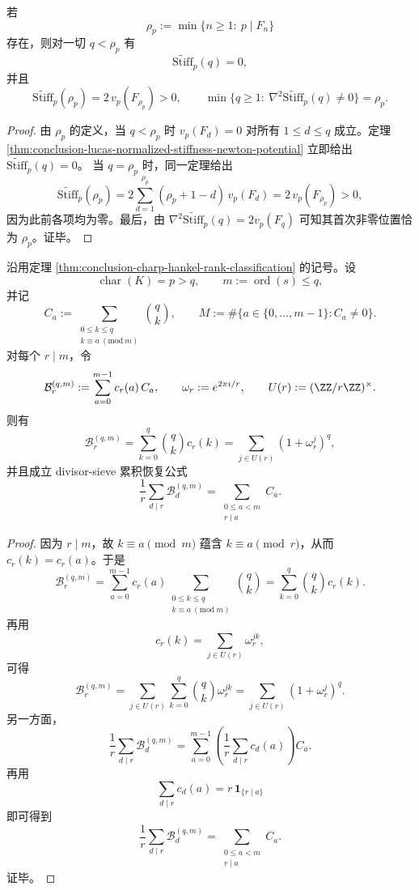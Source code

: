 \begin{corollary}\label{cor:conclusion-lucas-stiffness-rank-of-apparition}
若
\[
\rho_p:=\min\{n\ge 1:\ p\mid F_n\}
\]
存在，则对一切 \(q<\rho_p\) 有
\[
\widetilde{\mathrm{Stiff}}_p(q)=0,
\]
并且
\[
\widetilde{\mathrm{Stiff}}_p(\rho_p)=2\,v_p(F_{\rho_p})>0,
\qquad
\min\{q\ge 1:\ \nabla^2\widetilde{\mathrm{Stiff}}_p(q)\neq 0\}=\rho_p.
\]
\end{corollary}
\begin{proof}
由 \(\rho_p\) 的定义，当 \(q<\rho_p\) 时 \(v_p(F_d)=0\) 对所有 \(1\le d\le q\) 成立。定理 \ref{thm:conclusion-lucas-normalized-stiffness-newton-potential} 立即给出
\(
\widetilde{\mathrm{Stiff}}_p(q)=0
\)。
当 \(q=\rho_p\) 时，同一定理给出
\[
\widetilde{\mathrm{Stiff}}_p(\rho_p)
=
2\sum_{d=1}^{\rho_p}(\rho_p+1-d)\,v_p(F_d)
=
2\,v_p(F_{\rho_p})>0,
\]
因为此前各项均为零。最后，由
\(
\nabla^2\widetilde{\mathrm{Stiff}}_p(q)=2v_p(F_q)
\)
可知其首次非零位置恰为 \(\rho_p\)。证毕。
\end{proof}

\begin{proposition}\label{prop:conclusion-charp-residue-lumping-ramanujan-shadows}
沿用定理 \ref{thm:conclusion-charp-hankel-rank-classification} 的记号。设
\[
\operatorname{char}(K)=p>q,\qquad
m:=\operatorname{ord}(s)\le q,
\]
并记
\[
C_a:=\sum_{\substack{0\le k\le q\\ k\equiv a\ (\mathrm{mod}\ m)}}\binom{q}{k},
\qquad
M:=\#\{a\in\{0,\dots,m-1\}:C_a\neq 0\}.
\]
对每个 \(r\mid m\)，令
\[
\mathcal B_r^{(q,m)}:=\sum_{a=0}^{m-1}c_r(a)\,C_a,
\qquad
\omega_r:=e^{2\pi i/r},
\qquad
U(r):=(\ZZ/r\ZZ)^\times.
\]
则有
\[
\mathcal B_r^{(q,m)}
=
\sum_{k=0}^{q}\binom{q}{k}c_r(k)
=
\sum_{j\in U(r)}(1+\omega_r^j)^q,
\]
并且成立 divisor-sieve 累积恢复公式
\[
\frac1r\sum_{d\mid r}\mathcal B_d^{(q,m)}
=
\sum_{\substack{0\le a<m\\ r\mid a}}C_a.
\]
\end{proposition}
\begin{proof}
因为 \(r\mid m\)，故 \(k\equiv a\pmod m\) 蕴含 \(k\equiv a\pmod r\)，从而 \(c_r(k)=c_r(a)\)。于是
\[
\mathcal B_r^{(q,m)}
=
\sum_{a=0}^{m-1}c_r(a)\sum_{\substack{0\le k\le q\\ k\equiv a\ (\mathrm{mod}\ m)}}\binom{q}{k}
=
\sum_{k=0}^{q}\binom{q}{k}c_r(k).
\]
再用
\[
c_r(k)=\sum_{j\in U(r)}\omega_r^{jk},
\]
可得
\[
\mathcal B_r^{(q,m)}
=
\sum_{j\in U(r)}\sum_{k=0}^{q}\binom{q}{k}\omega_r^{jk}
=
\sum_{j\in U(r)}(1+\omega_r^j)^q.
\]
另一方面，
\[
\frac1r\sum_{d\mid r}\mathcal B_d^{(q,m)}
=
\sum_{a=0}^{m-1}
\left(\frac1r\sum_{d\mid r}c_d(a)\right)C_a.
\]
再用
\[
\sum_{d\mid r}c_d(a)=r\,\mathbf 1_{\{r\mid a\}}
\]
即可得到
\[
\frac1r\sum_{d\mid r}\mathcal B_d^{(q,m)}
=
\sum_{\substack{0\le a<m\\ r\mid a}}C_a.
\]
证毕。
\end{proof}

